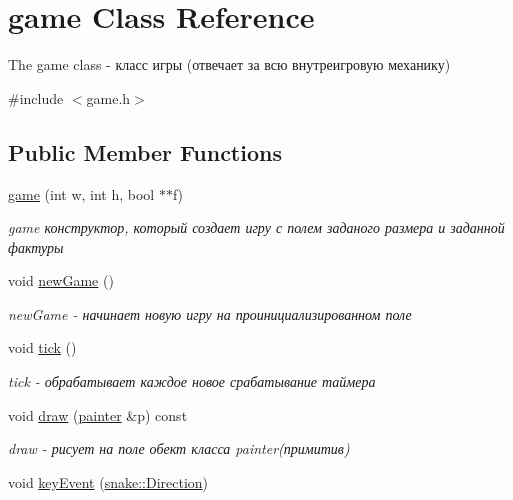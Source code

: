 \hypertarget{classgame}{}\section{game Class Reference}
\label{classgame}


The game class -\/ класс игры (отвечает за всю внутреигровую механику)  




{\ttfamily \#include $<$game.\+h$>$}

\subsection*{Public Member Functions}
\begin{DoxyCompactItemize}
\item 
\hyperlink{classgame_a5cd0e53cd7390f67ab998a79dd4845a3}{game} (int w, int h, bool $\ast$$\ast$f)
\begin{DoxyCompactList}\small\item\em game конструктор, который создает игру с полем заданого размера и заданной фактуры \end{DoxyCompactList}\item 
\hypertarget{classgame_af5c426af77aebd8a30262985461d5db9}{}void \hyperlink{classgame_af5c426af77aebd8a30262985461d5db9}{new\+Game} ()\label{classgame_af5c426af77aebd8a30262985461d5db9}

\begin{DoxyCompactList}\small\item\em new\+Game -\/ начинает новую игру на проинициализированном поле \end{DoxyCompactList}\item 
\hypertarget{classgame_a09def2438c9cd99bbb6de50cbb522b6f}{}void \hyperlink{classgame_a09def2438c9cd99bbb6de50cbb522b6f}{tick} ()\label{classgame_a09def2438c9cd99bbb6de50cbb522b6f}

\begin{DoxyCompactList}\small\item\em tick -\/ обрабатывает каждое новое срабатывание таймера \end{DoxyCompactList}\item 
void \hyperlink{classgame_a4942c71770f579508e3e2ea6bc066fbe}{draw} (\hyperlink{classpainter}{painter} \&p) const 
\begin{DoxyCompactList}\small\item\em draw -\/ рисует на поле обект класса painter(примитив) \end{DoxyCompactList}\item 
\hypertarget{classgame_ae01f3a26ab769ed793f380f0fc9cfa4b}{}void \hyperlink{classgame_ae01f3a26ab769ed793f380f0fc9cfa4b}{key\+Event} (\hyperlink{classsnake_adbd63ec22af655a4827ae26c7b9f5216}{snake\+::\+Direction})\label{classgame_ae01f3a26ab769ed793f380f0fc9cfa4b}


\end{DoxyCompactItemize}
